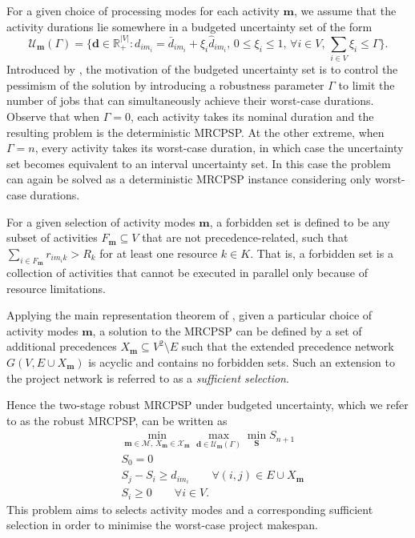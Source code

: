 \documentclass[a4paper,abstracton]{scrartcl}
\newcommand{\M}{{\mathcal{M}}}
\newcommand{\U}{{\mathcal{U}}}
\newcommand{\X}{{\mathcal{X}}}
\begin{document}
For a given choice of processing modes for each activity $\bm{m}$, we assume that the activity durations lie somewhere in a budgeted uncertainty set of the form
$$\U_{\bm{m}}(\Gamma)=\Bigg\{\bm{d}\in\mathbb{R}_+^{|V|}:d_{im_i}=\bar{d}_{im_i}+\xi_i\hat{d}_{im_i},\,0\leq \xi_i \leq 1,\,\forall i\in V,\,\sum_{i\in V}\xi_i \leq \Gamma\Bigg\}.$$
Introduced by \cite{bertsimas2004price}, the motivation of the budgeted uncertainty set is to control the pessimism of the solution by introducing a robustness parameter $\Gamma$ to limit the number of jobs that can simultaneously achieve their worst-case durations. Observe that when $\Gamma=0$, each activity takes its nominal duration and the resulting problem is the deterministic MRCPSP. At the other extreme, when $\Gamma=n$, every activity takes its worst-case duration, in which case the uncertainty set becomes equivalent to an interval uncertainty set. In this case the problem can again be solved as a deterministic MRCPSP instance considering only worst-case durations.

For a given selection of activity modes $\bm{m}$, a forbidden set is defined to be any subset of activities $F_{\bm{m}}\subseteq V$ that are not precedence-related, such that $\sum_{i\in F_{\bm{m}}}r_{im_ik}>R_k$ for at least one resource $k\in K$. That is, a forbidden set is a collection of activities that cannot be executed in parallel only because of resource limitations.

Applying the main representation theorem of \cite{bartusch1988scheduling}, given a particular choice of activity modes $\bm{m}$, a solution to the MRCPSP can be defined by a set of additional precedences $X_{\bm{m}}\subseteq V^2\setminus E$ such that the extended precedence network $G(V,E\cup X_{\bm{m}})$ is acyclic and contains no forbidden sets. Such an extension to the project network is referred to as a \textit{sufficient selection}. 

Hence the two-stage robust MRCPSP under budgeted uncertainty, which we refer to as the robust MRCPSP, can be written as
\begin{align}
	& \min_{\bm{m}\in \M,\,X_{\bm{m}}\in \X_{\bm{m}}} \max_{\bm{d}\in\U_{\bm{m}}(\Gamma)} \min_{\bm{S}} S_{n+1}\label{eqn:robust_mrcpsp_1}\\
	& S_0 = 0\\
	& S_j - S_i \geq d_{im_i} \qquad \forall (i,j)\in E\cup X_{\bm{m}}\\
	& S_i \geq 0 \qquad \forall i\in V.\label{eqn:robust_mrcpsp_4}
\end{align}
This problem aims to selects activity modes and a corresponding sufficient selection in order to minimise the worst-case project makespan. 
\end{document}
